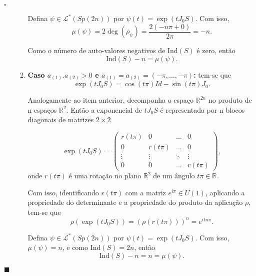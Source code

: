 \documentclass[12pt]{book}
\newenvironment{prova}[1]{$\square$ #1}{\hfill$\blacksquare$}
\newcommand{\caminhosespeciais}[1]{\mathcal{L}^{*}(#1)}
\newcommand{\estruturacomplexa}{J_{0}}
\newcommand{\gruposimpletico}[1]{Sp(#1)}
\newcommand{\ind}{\text{Ind}}
\newcommand{\real}[1]{\mathbb{R}^{#1}}
\newcommand{\reta}{\real{}}
\begin{document}
\begin{prova}
\begin{enumerate}
\begin{enumerate}
				Defina $\psi \in \caminhosespeciais{\gruposimpletico{2n}}$ por $\psi(t) = \exp(t\estruturacomplexa S)$. Com isso, 
				$$
				\mu(\psi) = 2\deg(\rho_{\psi}) = \frac{2(-n\pi +0)}{2\pi}=-n.
				$$
				
				Como o número de auto-valores negativos de $\ind(S)$ é zero, então  
				$$
				\ind(S)-n=\mu(\psi).
				$$
				
				\item \textbf{Caso $a_{(1)}.a_{(2)}>0$ e $a_{(1)} = a_{(2)} = (-\pi,\dots,-\pi)$:} tem-se que
				$$
				\exp(t\estruturacomplexa S) = \cos(t\pi)Id- \sin(t\pi)\estruturacomplexa.
				$$
				
				Analogamente ao item anterior, 	decomponha o espaço $\real{2n}$ no produto de n espaços $\real{2}$. Então a exponencial de $t\estruturacomplexa S$ é representada por n blocos diagonais de matrizes $2\times 2$
				
				$$
				\exp(t\estruturacomplexa S) =
				\left(
				\begin{array}{ccccc}
				r(t\pi) & 0 &\dots & 0 
				\\
				0 & r(t\pi) &\dots & 0 
				\\
				\vdots & \vdots & \ddots & \vdots 
				\\
				0 & 0 & \dots & r(t\pi)
				\end{array}
				\right),
				$$
				onde $r(t\pi)$ é uma rotação no plano $\real{2}$ de um ângulo $t\pi\in \reta$.
				
				Com isso, identificando $r(t\pi)$ com a matriz $e^{i\pi }\in U(1)$, aplicando a propriedade do determinante e a propriedade do produto da aplicação $\rho$, tem-se que 
				$$
				\rho(\exp(t\estruturacomplexa S)) = (\rho(r(t\pi)))^{n} = e^{itn\pi}.
				$$
				
				
				Defina $\psi \in \caminhosespeciais{\gruposimpletico{2n}}$ por $\psi(t) = \exp(t\estruturacomplexa S)$. Com isso, $\mu(\psi) = n $, e como $\ind(S) = 2n$, então 
				$$ 
				\ind(S)-n = n = \mu(\psi).
				$$
				

\end{enumerate}
\end{enumerate}
\end{prova}
\end{document}
